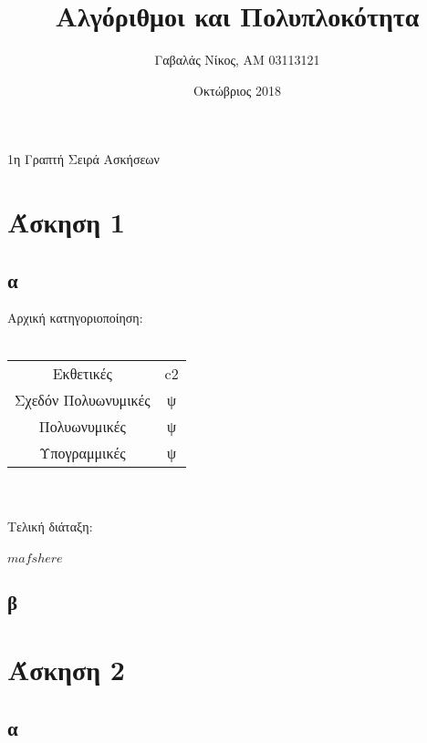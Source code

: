 \documentclass[10pt,a4paper]{article}
\title{Αλγόριθμοι και Πολυπλοκότητα}
\author{Γαβαλάς Νίκος, AM 03113121}
\date{Οκτώβριος 2018}
\begin{document}
  \maketitle

  \begin{center}
    \Large{1η Γραπτή Σειρά Ασκήσεων}
  \end{center}

  \section{Άσκηση 1}
  \subsection{α}
    Αρχική κατηγοριοποίηση: \\
    \\
    \begin{tabular}{ c c }
      \hline
      Εκθετικές & c2 \\
      Σχεδόν Πολυωνυμικές & ψ \\
      Πολυωνυμικές & ψ \\
      Υπογραμμικές & ψ \\
      \hline
    \end{tabular}\\
    \\
    Τελική διάταξη:\\
    \\
    \( mafs here \)

  \subsection{β}

  \section{Άσκηση 2}
  \subsection{α}

  
\end{document}
